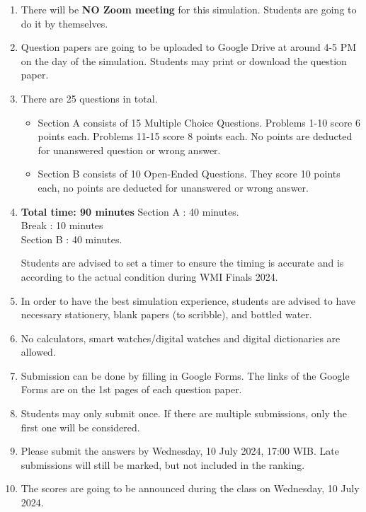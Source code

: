 \documentclass[12pt]{scrartcl}
\begin{document}
\begin{enumerate}[leftmargin=*]
    \item There will be \textbf{NO Zoom meeting} for this simulation. Students are going to do it by themselves.
    
    \item Question papers are going to be uploaded to Google Drive at around 4-5 PM on the day of the simulation. Students may print or download the question paper.
    
    \item There are 25 questions in total.
    \begin{itemize}
        \item Section A consists of 15 Multiple Choice Questions. Problems 1-10 score 6 points each. Problems 11-15 score 8 points each. No points are deducted for unanswered question or wrong answer.
        \item Section B consists of 10 Open-Ended Questions. They score 10 points each, no points are deducted for unanswered or wrong answer.
    \end{itemize}

    \item \textbf{Total time: 90 minutes} 
    \newline
    Section A : 40 minutes.\\
    Break : 10 minutes \\
    Section B : 40 minutes.
    
    Students are advised to set a timer to ensure the timing is accurate and is according to the actual condition during WMI Finals 2024.
    
    \item In order to have the best simulation experience, students are advised to have necessary stationery, blank papers (to scribble), and bottled water.
    
    \item No calculators, smart watches/digital watches and digital dictionaries are allowed.
    
    \item Submission can be done by filling in Google Forms. The links of the Google Forms are on the 1st pages of each question paper.
    
    \item Students may only submit once. If there are multiple submissions, only the first one will be considered.
    
    \item Please submit the answers by Wednesday, 10 July 2024, 17:00 WIB. Late submissions will still be marked, but not included in the ranking.
    
    \item The scores are going to be announced during the class on Wednesday, 10 July 2024.
\end{enumerate}
\end{document}
